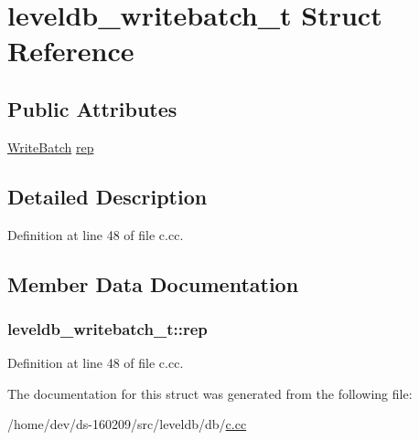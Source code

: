 \hypertarget{structleveldb__writebatch__t}{}\section{leveldb\+\_\+writebatch\+\_\+t Struct Reference}
\label{structleveldb__writebatch__t}
\subsection*{Public Attributes}
\begin{DoxyCompactItemize}
\item 
\hyperlink{classleveldb_1_1_write_batch}{Write\+Batch} \hyperlink{structleveldb__writebatch__t_ac96538c849db578bea786bf29fae6e5f}{rep}
\end{DoxyCompactItemize}


\subsection{Detailed Description}


Definition at line 48 of file c.\+cc.



\subsection{Member Data Documentation}
\hypertarget{structleveldb__writebatch__t_ac96538c849db578bea786bf29fae6e5f}{}
\subsubsection[{rep}]{ leveldb\+\_\+writebatch\+\_\+t\+::rep}\label{structleveldb__writebatch__t_ac96538c849db578bea786bf29fae6e5f}


Definition at line 48 of file c.\+cc.



The documentation for this struct was generated from the following file\+:\begin{DoxyCompactItemize}
\item 
/home/dev/ds-\/160209/src/leveldb/db/\hyperlink{c_8cc}{c.\+cc}\end{DoxyCompactItemize}
